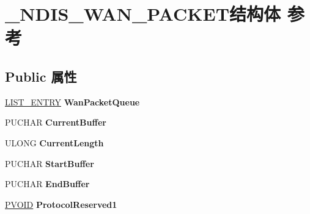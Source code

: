 \hypertarget{struct___n_d_i_s___w_a_n___p_a_c_k_e_t}{}\section{\+\_\+\+N\+D\+I\+S\+\_\+\+W\+A\+N\+\_\+\+P\+A\+C\+K\+E\+T结构体 参考}
\label{struct___n_d_i_s___w_a_n___p_a_c_k_e_t}
\subsection*{Public 属性}
\begin{DoxyCompactItemize}
\item 
\mbox{\label{struct___n_d_i_s___w_a_n___p_a_c_k_e_t_adda7dd9e6cc6cd9d3df26b670dd48f07}} 
\hyperlink{struct___l_i_s_t___e_n_t_r_y}{L\+I\+S\+T\+\_\+\+E\+N\+T\+RY} {\bfseries Wan\+Packet\+Queue}
\item 
\mbox{\label{struct___n_d_i_s___w_a_n___p_a_c_k_e_t_adf4db2689d60bd594f55fe11b8540f59}} 
P\+U\+C\+H\+AR {\bfseries Current\+Buffer}
\item 
\mbox{\label{struct___n_d_i_s___w_a_n___p_a_c_k_e_t_a2957228323c49ed4ebe456c7b0d2f2e2}} 
U\+L\+O\+NG {\bfseries Current\+Length}
\item 
\mbox{\label{struct___n_d_i_s___w_a_n___p_a_c_k_e_t_a22b8980bc37530f3a202c0b41fd8a1fe}} 
P\+U\+C\+H\+AR {\bfseries Start\+Buffer}
\item 
\mbox{\label{struct___n_d_i_s___w_a_n___p_a_c_k_e_t_a25228a777312b734099afdfda4efa9d6}} 
P\+U\+C\+H\+AR {\bfseries End\+Buffer}
\item 
\mbox{\label{struct___n_d_i_s___w_a_n___p_a_c_k_e_t_ac34b49af3e4663e12356b7cd8c822ed8}} 
\hyperlink{interfacevoid}{P\+V\+O\+ID} {\bfseries Protocol\+Reserved1}
\item 
\mbox{\label{struct___n_d_i_s___w_a_n___p_a_c_k_e_t_af3f5f31e71c9219932796e982c127a44}} 

\end{DoxyCompactItemize}

